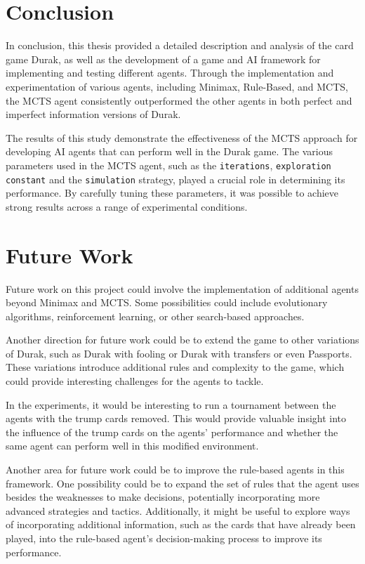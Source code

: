\chapter*{Conclusion}

In conclusion, this thesis provided a detailed description and analysis of the card game Durak, as well as the development of a game and AI framework for implementing and testing different agents. Through the implementation and experimentation of various agents, including Minimax, Rule-Based, and MCTS, the MCTS agent consistently outperformed the other agents in both perfect and imperfect information versions of Durak.

The results of this study demonstrate the effectiveness of the MCTS approach for developing AI agents that can perform well in the Durak game. The various parameters used in the MCTS agent, such as the \texttt{iterations}, \texttt{exploration constant} and the \texttt{simulation} strategy, played a crucial role in determining its performance. By carefully tuning these parameters, it was possible to achieve strong results across a range of experimental conditions.

\chapter*{Future Work}

Future work on this project could involve the implementation of additional agents beyond Minimax and MCTS. Some possibilities could include evolutionary algorithms, reinforcement learning, or other search-based approaches.

Another direction for future work could be to extend the game to other variations of Durak, such as Durak with fooling or Durak with transfers or even Passports. These variations introduce additional rules and complexity to the game, which could provide interesting challenges for the agents to tackle.

In the experiments, it would be interesting to run a tournament between the agents with the trump cards removed. This would provide valuable insight into the influence of the trump cards on the agents' performance and whether the same agent can perform well in this modified environment.

Another area for future work could be to improve the rule-based agents in this framework. One possibility could be to expand the set of rules that the agent uses besides the weaknesses to make decisions, potentially incorporating more advanced strategies and tactics. Additionally, it might be useful to explore ways of incorporating additional information, such as the cards that have already been played, into the rule-based agent's decision-making process to improve its performance.

